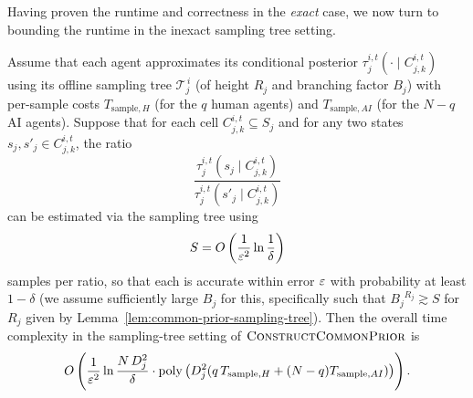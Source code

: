 Having proven the runtime and correctness in the \emph{exact} case, we now turn to bounding the runtime in the inexact sampling tree setting.
\begin{lemma}
\label{lem:approx-cp}
Assume that each agent approximates its conditional posterior $\tau^{i,t}_j(\cdot\mid C_{j,k}^{i,t})$ using its offline sampling tree $\mathcal{T}^{\,i}_j$ (of height $R_j$ and branching factor $B_j$) with per-sample costs $T_{\text{sample},H}$ (for the $q$ human agents) and $T_{\text{sample},AI}$ (for the $N-q$ AI agents). 
Suppose that for each cell $C_{j,k}^{i,t}\subseteq S_j$ and for any two states $s_j,s'_j\in C_{j,k}^{i,t}$, the ratio
\begin{equation*}
\frac{\tau^{i,t}_j(s_j\mid C_{j,k}^{i,t})}{\tau^{i,t}_j(s'_j\mid C_{j,k}^{i,t})}
\end{equation*}
can be estimated via the sampling tree using 
\begin{equation*}
S = O\left(\frac{1}{\varepsilon^2}\ln\frac{1}{\delta}\right)
\end{equation*}
samples per ratio, so that each is accurate within error $\varepsilon$ with probability at least $1-\delta$ (we assume sufficiently large ${B_j}$ for this, specifically such that ${B_j}^{R_j} \gtrsim S$ for $R_j$ given by  Lemma~\ref{lem:common-prior-sampling-tree}).
Then the overall time complexity in the sampling-tree setting of $\textsc{ConstructCommonPrior}$ is
\begin{equation*}
O\left(\frac{1}{\varepsilon^2}\ln\frac{N\,D_j^2}{\delta}\cdot \mathrm{poly}\left(D_j^2(q\,T_{\text{sample},H}+(N-q)T_{\text{sample},AI})\right)\right).
\end{equation*}
\end{lemma}
